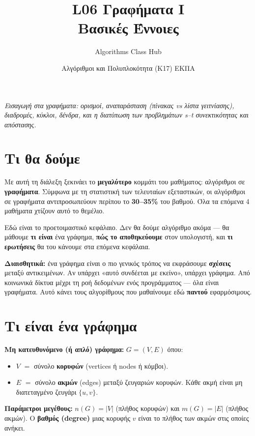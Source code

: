 \documentclass[11pt,a4paper]{article}
\title{\textbf{L06 \textperiodcentered{} Γραφήματα I}\\[2pt]
\large Βασικές Έννοιες}
\author{Algorithms Class Hub}
\date{\small Αλγόριθμοι και Πολυπλοκότητα (K17) \textperiodcentered{} ΕΚΠΑ}
\begin{document}
\maketitle

\begin{center}\itshape\small
Εισαγωγή στα γραφήματα: ορισμοί, αναπαράσταση (πίνακας vs λίστα γειτνίασης),
διαδρομές, κύκλοι, δένδρα, και η διατύπωση των προβλημάτων s--t συνεκτικότητας
και απόστασης.
\end{center}

\section{Τι θα δούμε}

Με αυτή τη διάλεξη ξεκινάει το \textbf{μεγαλύτερο} κομμάτι του μαθήματος:
αλγόριθμοι σε \textbf{γραφήματα}. Σύμφωνα με τη στατιστική των τελευταίων
εξεταστικών, οι αλγόριθμοι σε γραφήματα αντιπροσωπεύουν περίπου το
\textbf{30--35\%} του βαθμού. Όλα τα επόμενα 4 μαθήματα χτίζουν αυτό το θεμέλιο.

Εδώ είναι το προετοιμαστικό κεφάλαιο. Δεν θα δούμε αλγόριθμο ακόμα --- θα μάθουμε
\textbf{τι είναι} ένα γράφημα, \textbf{πώς το αποθηκεύουμε} στον υπολογιστή, και
\textbf{τι ερωτήσεις} θα του κάνουμε στα επόμενα κεφάλαια.

\begin{intuition}
\textbf{Διαισθητικά:} ένα γράφημα είναι ο πιο γενικός τρόπος να εκφράσουμε
\textbf{σχέσεις} μεταξύ αντικειμένων. Αν υπάρχει «αυτό συνδέεται με εκείνο»,
υπάρχει γράφημα. Από κοινωνικά δίκτυα μέχρι τη ροή δεδομένων ενός προγράμματος
--- όλα είναι γραφήματα. Αυτό κάνει τους αλγορίθμους που μαθαίνουμε εδώ
\textbf{παντού} εφαρμόσιμους.
\end{intuition}

\section{Τι είναι ένα γράφημα}

\textbf{Μη κατευθυνόμενο (ή απλό) γράφημα:} $G = (V, E)$ όπου:
\begin{itemize}
  \item $V$ $=$ σύνολο \textbf{κορυφών} (vertices ή nodes ή κόμβοι).
  \item $E$ $=$ σύνολο \textbf{ακμών} (edges) μεταξύ ζευγαριών κορυφών. Κάθε
  ακμή είναι μη διατεταγμένο ζευγάρι $\{u, v\}$.
\end{itemize}

\textbf{Παράμετροι μεγέθους:} $n(G) = |V|$ (πλήθος κορυφών) και
$m(G) = |E|$ (πλήθος ακμών). Ο \textbf{βαθμός (degree)} μιας κορυφής $v$ είναι το
πλήθος των ακμών στις οποίες ανήκει.
\end{document}
